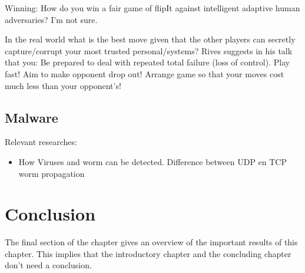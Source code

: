 Winning: How do you win a fair game of flipIt against intelligent adaptive human adversaries? I'm not sure.

In the real world what is the best move given that the other players can secretly capture/corrupt your most trusted personal/systems? Rives suggests in his talk that you:
Be prepared to deal with repeated total failure (loss of control).
Play fast! Aim to make opponent drop out!
Arrange game so that your moves cost much less than your opponent's!



\subsection{Malware}
Relevant researches:
\begin{itemize}
\item How Viruses and worm can be detected. Difference between UDP en TCP worm propagation
\end{itemize}




\section{Conclusion}
\label{Cha:1:Conclusion}
The final section of the chapter gives an overview of the important results
of this chapter. This implies that the introductory chapter and the
concluding chapter don't need a conclusion.



%


